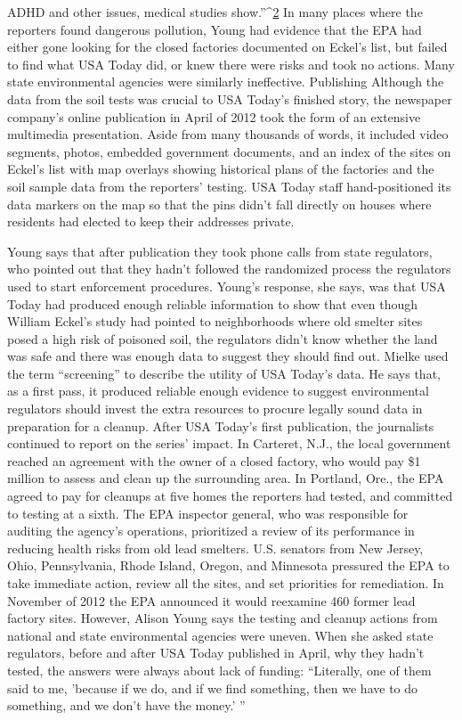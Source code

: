 ADHD and other issues, medical studies show.''^{\href{#endnotes-usa-today}{2}} In many places where the
reporters found dangerous pollution, Young had evidence that the EPA had
either gone looking for the closed factories documented on Eckel's list, but
failed to find what USA Today did, or knew there were risks and took no
actions. Many state environmental agencies were similarly ineffective.
Publishing
Although the data from the soil tests was crucial to USA Today's finished
story, the newspaper company's online publication in April of 2012 took the
form of an extensive multimedia presentation. Aside from many thousands
of words, it included video segments, photos, embedded government documents,
and an index of the sites on Eckel's list with map overlays showing
historical plans of the factories and the soil sample data from the reporters'
testing. USA Today staff hand-positioned its data markers on the map so
that the pins didn't fall directly on houses where residents had elected to
keep their addresses private.

Young says that after publication they took phone calls from state regulators,
who pointed out that they hadn't followed the randomized process
the regulators used to start enforcement procedures. Young's response, she
says, was that USA Today had produced enough reliable information to
show that even though William Eckel's study had pointed to neighborhoods
where old smelter sites posed a high risk of poisoned soil, the regulators
didn't know whether the land was safe and there was enough data to suggest
they should find out.
Mielke used the term ``screening'' to describe the utility of USA Today's
data. He says that, as a first pass, it produced reliable enough evidence to
suggest environmental regulators should invest the extra resources to procure
legally sound data in preparation for a cleanup.
After USA Today's first publication, the journalists continued to report on
the series' impact. In Carteret, N.J., the local government reached an agreement
with the owner of a closed factory, who would pay \$1 million to assess
and clean up the surrounding area. In Portland, Ore., the EPA agreed to pay
for cleanups at five homes the reporters had tested, and committed to testing
at a sixth. The EPA inspector general, who was responsible for auditing
the agency's operations, prioritized a review of its performance in reducing
health risks from old lead smelters. U.S. senators from New Jersey, Ohio,
Pennsylvania, Rhode Island, Oregon, and Minnesota pressured the EPA to
take immediate action, review all the sites, and set priorities for remediation.
In November of 2012 the EPA announced it would reexamine 460 former
lead factory sites. However, Alison Young says the testing and cleanup
actions from national and state environmental agencies were uneven. When
she asked state regulators, before and after USA Today published in April,
why they hadn't tested, the answers were always about lack of funding: ``Literally,
one of them said to me, 'because if we do, and if we find something,
then we have to do something, and we don't have the money.' ''

